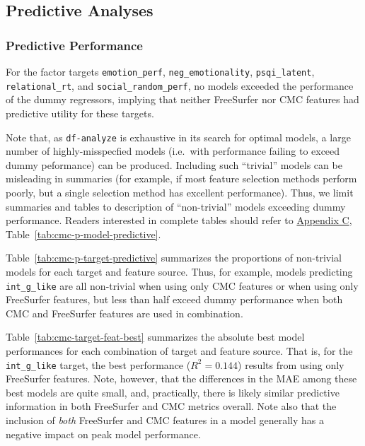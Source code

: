 \documentclass{article}
\newcommand{\CMC}{\(\text{CMC}\) }
\begin{document}
%


\subsection{Predictive Analyses}

\subsubsection{Predictive Performance} \label{sec:pred-performance}

For the factor targets \texttt{emotion\_perf}, \texttt{neg\_emotionality},
\texttt{psqi\_latent}, \texttt{relational\_rt}, and
\texttt{social\_random\_perf}, no models exceeded the performance of the
dummy regressors, implying that neither FreeSurfer nor CMC features had
predictive utility for these targets.

Note that, as \texttt{df-analyze} is exhaustive in its search for optimal
models, a large number of highly-misspecfied models (i.e.\ with performance
failing to exceed dummy peformance) can be produced. Including such
``trivial'' models can be misleading in summaries (for example, if most
feature selection methods perform poorly, but a single selection method has
excellent performance). Thus, we limit summaries and tables to description of
``non-trivial'' models exceeding dummy performance. Readers interested in
complete tables should refer to \hyperref[sec:appendix-c]{Appendix C},
Table~\ref{tab:cmc-p-model-predictive}.


Table~\ref{tab:cmc-p-target-predictive} summarizes the proportions of
non-trivial models for each target and feature source. Thus, for example,
models predicting \texttt{int\_g\_like} are all non-trivial when using only
\CMC features or when using only FreeSurfer features, but less than half
exceed dummy performance when both \CMC and FreeSurfer features are used
in combination.

Table~\ref{tab:cmc-target-feat-best} summarizes the absolute best model
performances for each combination of target and feature source. That is, for
the \texttt{int\_g\_like} target, the best performance (\(R^2=0.144\))
results from using only FreeSurfer features. Note, however, that the differences in
the MAE among these best models are quite small, and, practically, there is
likely similar predictive information in both FreeSurfer and \CMC metrics overall.
Note also that the inclusion of \emph{both} FreeSurfer and \CMC features in a
model generally has a negative impact on peak model performance.
\end{document}

